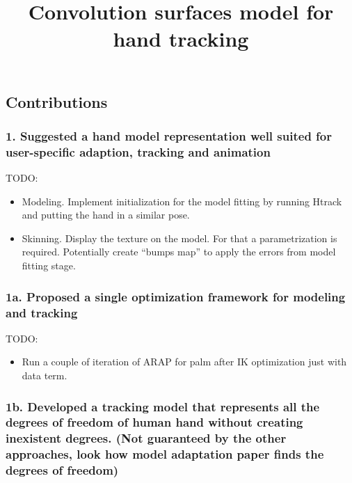 \documentclass[tog]{acmsiggraph}
\title{Convolution surfaces model  for hand tracking}
\author{}
\begin{document}
\maketitle




%

\subsection{Contributions}

\subsubsection*{1. Suggested a hand model representation well suited for user-specific adaption, tracking and animation}

TODO: 

\begin{itemize}
\item Modeling. Implement initialization for the model fitting by running Htrack and putting the hand in a similar pose. 
\item Skinning. Display the texture on the model. For that a parametrization is required. Potentially create ``bumps map'' to apply the errors from model fitting stage. 
\end{itemize}

\subsubsection*{1a. Proposed a single optimization framework for modeling and tracking}

TODO:

\begin{itemize}
\item Run a couple of iteration of ARAP for palm after IK optimization just with data term.
\end{itemize}

\subsubsection*{1b. Developed a tracking model that represents all the degrees of freedom of human hand without creating inexistent degrees. (Not guaranteed by the other approaches, look how model adaptation paper finds the degrees of freedom)}
\end{document}
